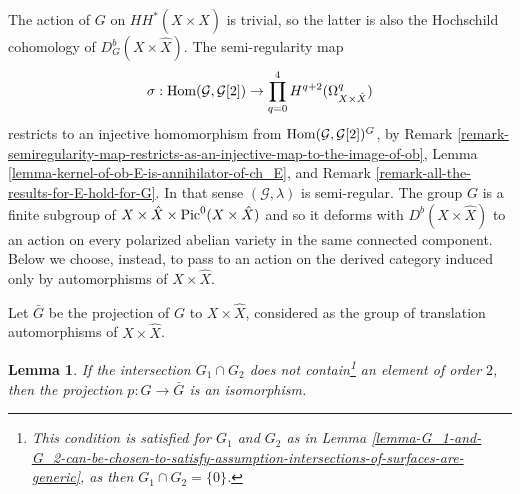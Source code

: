 \documentclass[12pt]{amsart}
\newcommand{\hide}[1]{}
\numberwithin{equation}{subsection}
\theoremstyle{plain}
\newtheorem{lem}[thm]{Lemma}
\theoremstyle{definition}
\newcommand{\E}{{\mathcal E}}
\newcommand{\G}{{\mathcal G}}
\newcommand{\Pic}{{\rm Pic}}
\newcommand{\Hom}{{\rm Hom}}
\begin{document}
The action of $G$ on $HH^*(X\times\hat{X})$ is trivial, so the latter is also the 
Hochschild cohomology of $D^b_G(X\times\hat{X}).$
The semi-regularity map 
\[
\sigma: \Hom(\G,\G[2])\rightarrow \prod_{q=0}^4 H^{q+2}(\Omega^q_{X\times\hat{X}})
\]
restricts to an injective homomorphism from 
$\Hom(\G,\G[2])^G$, by Remark \ref{remark-semiregularity-map-restricts-as-an-injective-map-to-the-image-of-ob}, Lemma \ref{lemma-kernel-of-ob-E-is-annihilator-of-ch_E}, and Remark \ref{remark-all-the-results-for-E-hold-for-G}.
In that sense $(\G,\lambda)$ is semi-regular.
The group $G$ is a finite subgroup of $X\times\hat{X} \times \Pic^0(X\times\hat{X})$ and so it deforms with $D^b(X\times\hat{X})$ to an action on every polarized abelian variety in the same connected component. Below we choose, instead, to pass to an action on the derived category induced only by automorphisms of $X\times\hat{X}$.
\hide{
So an equivariant version of the unobstructedness result of \cite[Th. 5.1]{buchweitz-flenner}
should yield the deformability of $[X\times\hat{X},(\G,\lambda)]$ 
to a pair $[A,(\G',\lambda')],$
for every polarized abelian variety $A$ of Hodge-Weil type in  the connected component of $X\times\hat{X}$, at least in  some open neighborhood of the latter. 
We need, however, to deform $\E:=\G^\vee[-1]$ as a twisted sheaf allowing also gerby deformations of $X\times\hat{X}$.
}


Let $\bar{G}$ be the projection of $G$ to $X\times \hat{X}$, considered as the group of translation automorphisms of $X\times \hat{X}$. 

\begin{lem} 
\label{lemma-the-projection-of-G-to-bar-G-is-an-isomorphism} 
If the intersection $G_1\cap G_2$ does not contain\footnote{This condition is satisfied for $G_1$ and $G_2$ as in 
Lemma \ref{lemma-G_1-and-G_2-can-be-chosen-to-satisfy-assumption-intersections-of-surfaces-are-generic}, as then $G_1\cap G_2=\{0\}$.} 
an element of order $2$, then 
the projection $p:G\rightarrow \bar{G}$ is an isomorphism. 
\end{lem}
\end{document}
